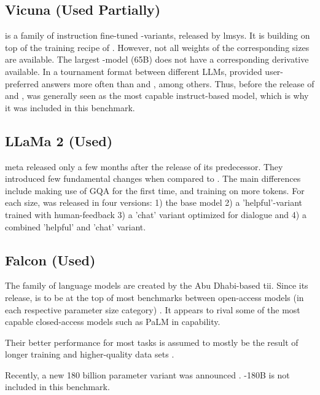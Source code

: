 \subsection{Vicuna (Used Partially)}\label{sub:vicuna}
 is a family of instruction fine-tuned -variants, released by \gls{lmsys}. It is building on top of the training recipe of .
However, not all weights of the corresponding  sizes are available.
The largest -model (65B) does not have a corresponding  derivative available.
In a tournament format between different \glspl{LLM},  provided user-preferred answers more often than  and  \cite{zheng_judging_2023}, among others.
Thus, before the release of  and ,  was generally seen as the most capable instruct-based model, which is why it was included in this benchmark.


\subsection{LLaMa 2 (Used)}\label{sub:llama2}
\gls{meta} released  \cite{touvron_llama2_2023} only a few months after the release of its predecessor.
They introduced few fundamental changes when compared to .
The main differences include making use of \gls{GQA} for the first time, and training on more tokens.
For each size,  was released in four versions: 1) the base model 2) a 'helpful'-variant trained with human-feedback 3) a 'chat' variant optimized for dialogue and 4) a combined 'helpful' and 'chat' variant.


\subsection{Falcon (Used)}\label{sub:falcon}
The  \cite{zxhang_falcon_2023} family of language models are created by the Abu Dhabi-based \gls{tii}.
Since its release,  is to be at the top of most benchmarks between open-access models (in each respective parameter size category) \cite{zxhang_falcon_2023}.
It appears to rival some of the most capable closed-access models such as \gls{PaLM} in capability.

Their better performance for most tasks is assumed to mostly be the result of longer training and higher-quality data sets \cite{zxhang_falcon_2023}.

Recently, a new 180 billion parameter  variant was announced \cite{tii_falcon180b_2023}. -180B is not included in this benchmark.


